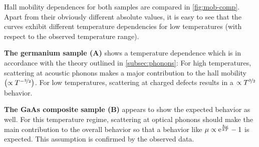 Hall mobility dependences for both samples are compared in \autoref{fig:mob-comp}.
Apart from their obviously different absolute values, it is easy to see that the curves exhibit different temperature dependencies for low temperatures (with respect to the observed temperature range).

\textbf{The germanium sample (A)} shows a temperature dependence which is in accordance with the theory outlined in \autoref{subsec:phonons}: For high temperatures, scattering at acoustic phonons makes a major contribution to the hall mobility $\left(\propto T^{-\nicefrac{3}{2}}\right)$.
For low temperatures, scattering at charged defects results in a $\propto T^{\nicefrac{3}{2}}$ behavior.

\textbf{The GaAs composite sample (B)} appears to show the expected behavior as well.
For this temperature regime, scattering at optical phonons should make the main contribution to the overall behavior so that a behavior like $\mu\propto \mathrm{e}^\frac{\hbar \omega}{k T} - 1$ is expected.
This assumption is confirmed by the observed data.
